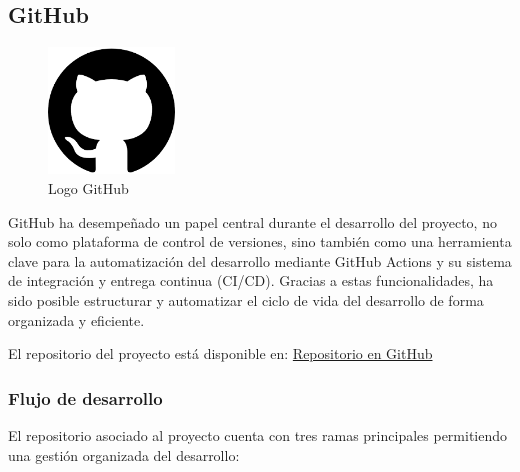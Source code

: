\subsection{GitHub}
\begin{figure}[H]
  \centering
  \includegraphics[width=0.3\textwidth]{fotos/git.png}
  \caption{Logo GitHub}
\end{figure}
GitHub ha desempeñado un papel central durante el desarrollo del proyecto, no solo como plataforma de control de versiones, sino también como una herramienta clave para la automatización del desarrollo mediante GitHub Actions \cite{GithubActions} y su sistema de integración y entrega continua (CI/CD). Gracias a estas funcionalidades, ha sido posible estructurar y automatizar el ciclo de vida del desarrollo de forma organizada y eficiente.

El repositorio del proyecto está disponible en: 
\href{https://github.com/alonsodm12/TFG_COHOUSING}{Repositorio en GitHub}


\subsubsection*{Flujo de desarrollo}

El repositorio asociado al proyecto cuenta con tres ramas principales permitiendo una gestión organizada del desarrollo:

